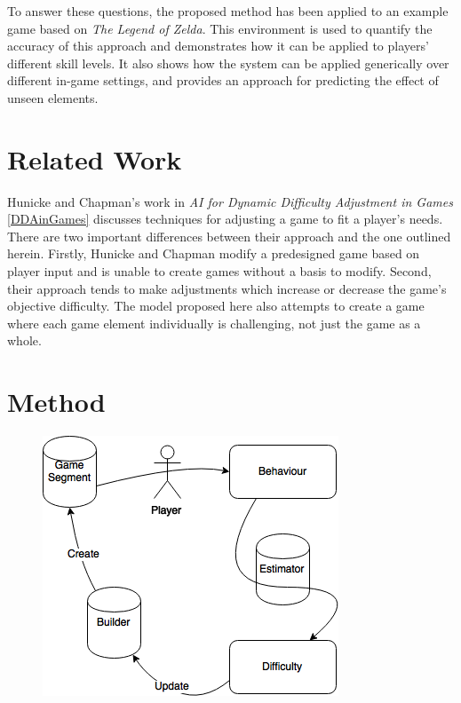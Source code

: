 \documentclass[a4paper]{article}
\begin{document}
\begin{multicols*}{2}
To answer these questions, the proposed method has been applied to an example game based on \emph{The Legend of Zelda}. This environment is used to quantify the accuracy of this approach and demonstrates how it can be applied to players' different skill levels. It also shows how the system can be applied generically over different in-game settings, and provides an approach for predicting the effect of unseen elements.

\section{Related Work}
Hunicke and Chapman's work in \emph{AI for Dynamic Difficulty Adjustment in Games} \ref{DDAinGames} discusses techniques for adjusting a game to fit a player's needs. There are two important differences between their approach and the one outlined herein. Firstly, Hunicke and Chapman modify a predesigned game based on player input and is unable to create games without a basis to modify. Second, their approach tends to make adjustments which increase or decrease the game's objective difficulty. The model proposed here also attempts to create a game where each game element individually is challenging, not just the game as a whole.

\section{Method}
\begin{figure}[t]
\centering
\includegraphics[width=\textwidth]{processflowchart}
\end{figure}


\end{multicols*}
\end{document}
